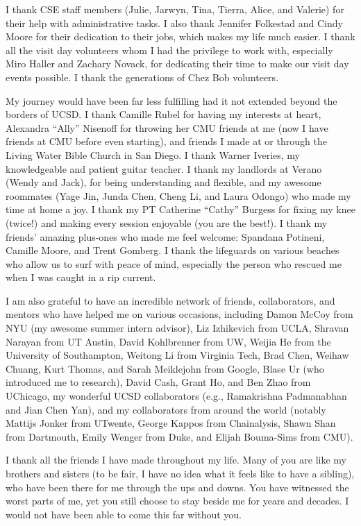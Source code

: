 \begin{acknowledgements}
I thank CSE staff members (Julie, Jarwyn, Tina, Tierra, Alice, and Valerie) for their help with administrative tasks. I also thank Jennifer Folkestad and Cindy Moore for their dedication to their jobs, which makes my life much easier. I thank all the visit day volunteers whom I had the privilege to work with, especially Miro Haller and Zachary Novack, for dedicating their time to make our visit day events possible. I thank the generations of Chez Bob volunteers.

My journey would have been far less fulfilling had it not extended beyond the borders of UCSD. I thank Camille Rubel for having my interests at heart, Alexandra ``Ally'' Nisenoff for throwing her CMU friends at me (now I have friends at CMU before even starting), and friends I made at or through the Living Water Bible Church in San Diego. I thank Warner Iveries, my knowledgeable and patient guitar teacher. I thank my landlords at Verano (Wendy and Jack), for being understanding and flexible, and my awesome roommates (Yage Jin, Junda Chen, Cheng Li, and Laura Odongo) who made my time at home a joy. I thank my PT Catherine ``Cathy'' Burgess for fixing my knee (twice!) and making every session enjoyable (you are the best!). I thank my friends' amazing plus-ones who made me feel welcome: Spandana Potineni, Camille Moore, and Trent Gomberg.
I thank the lifeguards on various beaches who allow us to surf with peace of mind, especially the person who rescued me when I was caught in a rip current. 


I am also grateful to have an incredible network of friends, collaborators, and mentors who have helped me on various occasions, including Damon McCoy from NYU (my awesome summer intern advisor), Liz Izhikevich from UCLA, Shravan Narayan from UT Austin, David Kohlbrenner from UW, Weijia He from the University of Southampton, Weitong Li from Virginia Tech, Brad Chen, Weihaw Chuang, Kurt Thomas, and Sarah Meiklejohn from Google, Blase Ur (who introduced me to research), David Cash, Grant Ho, and Ben Zhao from UChicago, my wonderful UCSD collaborators (e.g., Ramakrishna Padmanabhan and Jian Chen Yan), and my collaborators from around the world (notably Mattijs Jonker from UTwente, George Kappos from Chainalysis, Shawn Shan from Dartmouth, Emily Wenger from Duke, and Elijah Bouma-Sims from CMU).

I thank all the friends I have made throughout my life. Many of you are like my brothers and sisters (to be fair, I have no idea what it feels like to have a sibling), who have been there for me through the ups and downs. You have witnessed the worst parts of me, yet you still choose to stay beside me for years and decades. I would not have been able to come this far without you.


\end{acknowledgements}

